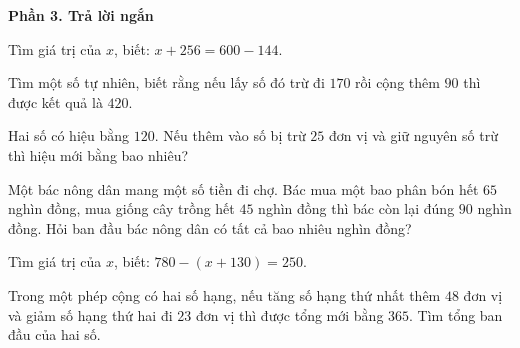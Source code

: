 \textbf{Phần 3. Trả lời ngắn}

\begin{ex} %
Tìm giá trị của $x$, biết: $x + 256 = 600 - 144$.
\end{ex}

\begin{ex} %
Tìm một số tự nhiên, biết rằng nếu lấy số đó trừ đi $170$ rồi cộng thêm $90$ thì được kết quả là $420$.
\end{ex}

\begin{ex} %
Hai số có hiệu bằng $120$. Nếu thêm vào số bị trừ $25$ đơn vị và giữ nguyên số trừ thì hiệu mới bằng bao nhiêu?
\end{ex}

\begin{ex} %
Một bác nông dân mang một số tiền đi chợ. Bác mua một bao phân bón hết $65$ nghìn đồng, mua giống cây trồng hết $45$ nghìn đồng thì bác còn lại đúng $90$ nghìn đồng. Hỏi ban đầu bác nông dân có tất cả bao nhiêu nghìn đồng?
\end{ex}

\begin{ex} %
Tìm giá trị của $x$, biết: $780 - (x + 130) = 250$.
\end{ex}

\begin{ex} %
Trong một phép cộng có hai số hạng, nếu tăng số hạng thứ nhất thêm $48$ đơn vị và giảm số hạng thứ hai đi $23$ đơn vị thì được tổng mới bằng $365$. Tìm tổng ban đầu của hai số.
\end{ex}
